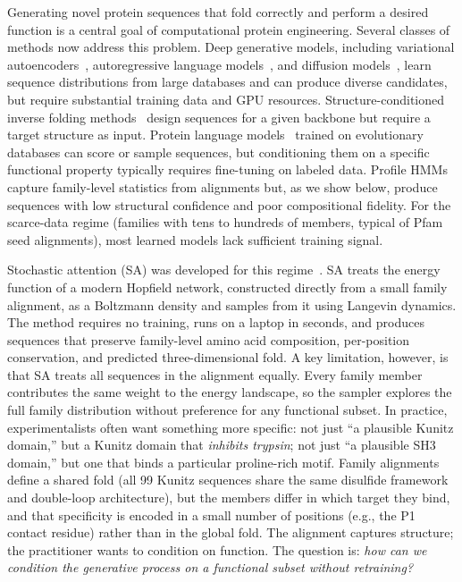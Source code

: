 Generating novel protein sequences that fold correctly and perform a desired function is a
central goal of computational protein engineering. Several classes of methods now address this
problem. Deep generative models, including variational autoencoders~\cite{sinaiAdaptiveMLDE2020},
autoregressive language models~\cite{madaniProGen2023}, and diffusion
models~\cite{alamdariProteinGeneration2023}, learn sequence distributions from large databases
and can produce diverse candidates, but require substantial training data and GPU resources.
Structure-conditioned inverse folding methods~\cite{dauparasProteinMPNN2022} design sequences for
a given backbone but require a target structure as input. Protein language
models~\cite{esmfold2022} trained on evolutionary databases can score or sample sequences, but
conditioning them on a specific functional property typically requires fine-tuning on labeled
data. Profile HMMs~\cite{hmmer3} capture family-level statistics from alignments but, as we show
below, produce sequences with low structural confidence and poor compositional fidelity. For the
scarce-data regime (families with tens to hundreds of members, typical of Pfam seed alignments),
most learned models lack sufficient training signal.

Stochastic attention (SA) was developed for this regime~\cite{varnerSAProtein2026}. SA treats the
energy function of a modern Hopfield network, constructed directly from a small family alignment,
as a Boltzmann density and samples from it using Langevin dynamics. The method requires no
training, runs on a laptop in seconds, and produces sequences that preserve family-level amino
acid composition, per-position conservation, and predicted three-dimensional fold. A key
limitation, however, is that SA treats all sequences in the alignment equally. Every family
member contributes the same weight to the energy landscape, so the sampler explores the full
family distribution without preference for any functional subset. In practice, experimentalists
often want something more specific: not just ``a plausible Kunitz domain,'' but a Kunitz domain
that \emph{inhibits trypsin}; not just ``a plausible SH3 domain,'' but one that binds a
particular proline-rich motif. Family alignments define a shared fold (all 99 Kunitz sequences
share the same disulfide framework and double-loop architecture), but the members differ in
which target they bind, and that specificity is encoded in a small number of positions (e.g.,
the P1 contact residue) rather than in the global fold. The alignment captures structure; the
practitioner wants to condition on function. The question is: \emph{how can we condition the
generative process on a functional subset without retraining?}

